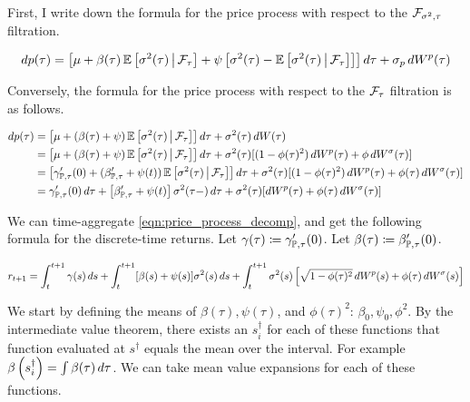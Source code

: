 \documentclass[11pt, letterpaper, twoside, final]{article}
\begin{document}

First, I write down the formula for the price process with respect to the $\mathcal{F}_{\sigma^2, \tau}$ filtration.

\begin{align}
    \mathop{}\!d p(\tau) = \left[\mu + \beta(\tau) \operatorname{\mathbb{E}}\left[\sigma^2(\tau)  \,\middle\vert\, \mathcal{F}_{\tau}\right]  + \psi
    \left[\sigma^2(\tau) - \operatorname{\mathbb{E}}\left[\sigma^2(\tau)  \,\middle\vert\, \mathcal{F}_{\tau}\right]\right]\right]  \mathop{}\!d \tau + \sigma_{p}
    \mathop{}\!d W^{p}(\tau) 
\end{align}

Conversely, the formula for the price process with respect to the $\mathcal{F}_{\tau}$ filtration is as follows. 

\begin{align}
    \dif p(\tau) &= \left[\mu + (\beta(\tau) + \psi) \E\left[\sigma^2(\tau)  \mvert \F_{\tau}\right]\right] \dif
        \tau + \sigma^2(\tau) \dif W(\tau)  \\
    &= \left[\mu + (\beta(\tau) + \psi) \E\left[\sigma^2(\tau)  \mvert \F_{\tau}\right]\right] \dif \tau +
       \sigma^2(\tau) [(1 - \phi(\tau)^2) \dif W^{p}(\tau) + \phi \dif W^{\sigma}(\tau)] \\
    &= \left[\gamma_{\PP, \tau}'(0) + (\beta_{\PP, \tau}'  + \psi(t) ) \E\left[\sigma^2(\tau)  \mvert
       \F_{\tau}\right]\right] \dif \tau + \sigma^2(\tau) [(1 - \phi(\tau)^2)\dif W^{p}(\tau) + \phi(\tau) \dif
   W^{\sigma}(\tau)] \\ \label{eqn:price_process_decomp}
    &= \gamma_{\PP, \tau}'(0) \dif \tau + \left[\beta_{\PP, \tau}'  + \psi(t)\right] \sigma^2(\tau-) \dif \tau +
       \sigma^2(\tau) [\dif W^{p}(\tau) + \phi(\tau) \dif W^{\sigma}(\tau)]
\end{align}


We can time-aggregate \cref{eqn:price_process_decomp}, and get the following formula for the discrete-time
returns.  
Let $\gamma(\tau) \coloneqq \gamma_{\mathbb{P}, \tau}'(0)$.
Let $\beta(\tau) \coloneqq \beta_{\mathbb{P}, \tau}'(0)$.


\begin{equation}
    r_{t+1} = \int_t^{t+1} \gamma(s) \mathop{}\!d s + \int_{t}^{t+1} [\beta(s) + \psi(s)] \sigma^2(s) \mathop{}\!d s +
    \int_t^{t+1} \sigma^2(s) \left[\sqrt{1 - \phi(\tau)^2} \mathop{}\!d W^{p}(s) + \phi(\tau) \mathop{}\!d W^{\sigma}(s)\right]
\end{equation}

We start by defining the means of $\beta(\tau), \psi(\tau)$, and $\phi(\tau)^2$: $\beta_0, \psi_0, \phi^2$.
By the intermediate value theorem, there exists an $s_i^{\dagger}$ for each of these functions that function
evaluated at $s^{\dagger}$ equals the mean over the interval.
For example $\beta\left(s_i^{\dagger}\right) = \int \beta(\tau) \mathop{}\!d \tau$.  
We can take mean value expansions for each of these functions.
\end{document}
